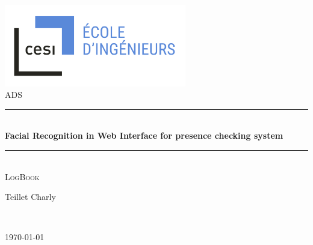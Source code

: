 
\begin{titlepage}

\newcommand{\HRule}{\rule{\linewidth}{2mm}} %

\center %
 




\includegraphics[width=300px, keepaspectratio]{Figures/CESI_Logo.jpg}\\[2cm] %


\textsc{\Large ADS  }\\[2cm] 

\rule{\textwidth}{0.4pt} \\[0.5cm]
{ \Huge \bfseries Facial Recognition in Web Interface for presence checking system }\\[0.1cm] %
\rule{\textwidth}{0.4pt} \\[1.5cm]

  \textsc{\LARGE    LogBook  }\\[2cm] %






\begin{minipage}{6in}
\begin{flushright}
   \Large {Teillet Charly}
\end{flushright}
\end{minipage}
\\[1.5cm]
\begin{minipage}{6in}
\begin{flushright}
   \Large {\today}
\end{flushright}
\end{minipage}
\\[1.5cm]

 

\vfill %

\end{titlepage}

